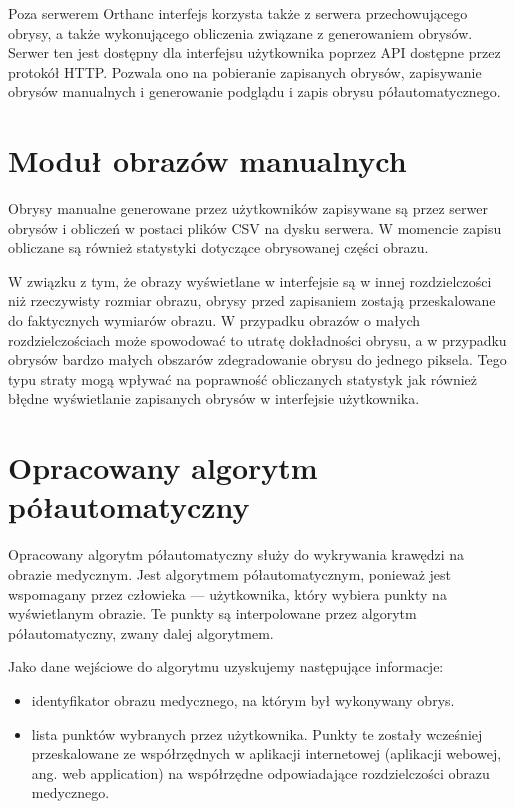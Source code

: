 \documentclass[a4paper,11pt,twoside,openright]{report}
\theoremstyle{definition}
\begin{document}
Poza serwerem Orthanc interfejs korzysta także z serwera przechowującego obrysy, a także wykonującego obliczenia związane z generowaniem obrysów. Serwer ten jest dostępny dla interfejsu użytkownika poprzez API dostępne przez protokół HTTP. Pozwala ono na pobieranie zapisanych obrysów, zapisywanie obrysów manualnych i generowanie podglądu i zapis obrysu półautomatycznego.

\section {Moduł obrazów manualnych}

Obrysy manualne generowane przez użytkowników zapisywane są przez serwer obrysów i obliczeń w postaci plików CSV na dysku serwera. W momencie zapisu obliczane są również statystyki dotyczące obrysowanej części obrazu.

W związku z tym, że obrazy wyświetlane w interfejsie są w innej rozdzielczości niż rzeczywisty rozmiar obrazu, obrysy przed zapisaniem zostają przeskalowane do faktycznych wymiarów obrazu. W przypadku obrazów o małych rozdzielczościach może spowodować to utratę dokładności obrysu, a w przypadku obrysów bardzo małych obszarów zdegradowanie obrysu do jednego piksela. Tego typu straty mogą wpływać na poprawność obliczanych statystyk jak również błędne wyświetlanie zapisanych obrysów w interfejsie użytkownika.

\section {Opracowany algorytm półautomatyczny}

Opracowany algorytm półautomatyczny służy do wykrywania krawędzi na obrazie medycznym. Jest algorytmem półautomatycznym, ponieważ jest wspomagany przez człowieka --- użytkownika, który wybiera punkty na wyświetlanym obrazie. Te punkty są interpolowane przez algorytm półautomatyczny, zwany dalej algorytmem.

Jako dane wejściowe do algorytmu uzyskujemy następujące informacje:
\begin{itemize}[noitemsep]
\item {identyfikator obrazu medycznego, na którym był wykonywany obrys.}
\item {lista punktów wybranych przez użytkownika. Punkty te zostały wcześniej przeskalowane ze współrzędnych w aplikacji internetowej (aplikacji webowej, ang. web application) na współrzędne odpowiadające rozdzielczości obrazu medycznego.}
\end{itemize}
\end{document}
